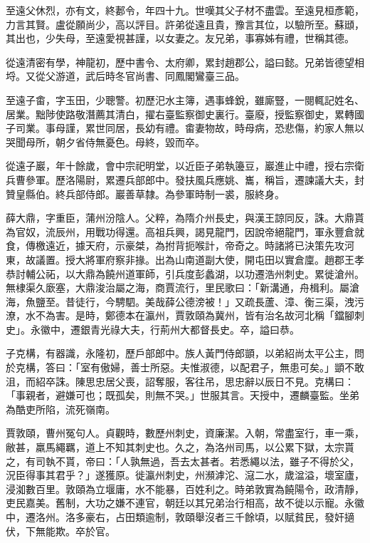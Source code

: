 \begin{pinyinscope}
 至遠父休烈，亦有文，終郪令，年四十九。世嘆其父子材不盡雲。至遠見桓彥範，力言其賢。盧從願尚少，高以評目。許弟從遠且貴，豫言其位，以驗所至。蘇頲，其出也，少失母，至遠愛視甚謹，以女妻之。友兄弟，事寡姊有禮，世稱其德。



 從遠清密有學，神龍初，歷中書令、太府卿，累封趙郡公，謚曰懿。兄弟皆德望相埒。又從父游道，武后時冬官尚書、同鳳閣鸞臺三品。



 至遠子畬，字玉田，少聰警。初歷汜水主簿，遇事蜂銳，雖廝豎，一閱輒記姓名、居業。黜陟使路敬潛薦其清白，擢右臺監察御史裏行。臺廢，授監察御史，累轉國子司業。事母謹，累世同居，長幼有禮。畬妻物故，時母病，恐悲傷，約家人無以哭聞母所，朝夕省侍無憂色。母終，毀而卒。



 從遠子巖，年十餘歲，會中宗祀明堂，以近臣子弟執籩豆，巖進止中禮，授右宗衛兵曹參軍。歷洛陽尉，累遷兵部郎中。發扶風兵應姚、巂，稱旨，遷諫議大夫，封贊皇縣伯。終兵部侍郎。巖善草隸。為參軍時制一裘，服終身。



 薛大鼎，字重臣，蒲州汾陰人。父粹，為隋介州長史，與漢王諒同反，誅。大鼎貰為官奴，流辰州，用戰功得還。高祖兵興，謁見龍門，因說帝絕龍門，軍永豐倉就食，傳檄遠近，據天府，示豪桀，為拊背扼喉計，帝奇之。時諸將已決策先攻河東，故議置。授大將軍府察非掾。出為山南道副大使，開屯田以實倉廩。趙郡王孝恭討輔公祏，以大鼎為饒州道軍師，引兵度彭蠡湖，以功遷浩州刺史。累徙滄州。無棣渠久廞塞，大鼎浚治屬之海，商賈流行，里民歌曰：「新溝通，舟楫利。屬滄海，魚鹽至。昔徒行，今騁駟。美哉薛公德滂被！」又疏長蘆、漳、衡三渠，洩污潦，水不為害。是時，鄭德本在瀛州，賈敦頤為冀州，皆有治名故河北稱「鐺腳刺史」。永徽中，遷銀青光祿大夫，行荊州大都督長史。卒，謚曰恭。



 子克構，有器識，永隆初，歷戶部郎中。族人黃門侍郎顗，以弟紹尚太平公主，問於克構，答曰：「室有傲婦，善士所惡。夫惟淑德，以配君子，無患可矣。」顗不敢沮，而紹卒誅。陳思忠居父喪，詔奪服，客往吊，思忠辭以辰日不見。克構曰：「事親者，避嫌可也；既孤矣，則無不哭。」世服其言。天授中，遷麟臺監。坐弟為酷吏所陷，流死嶺南。



 賈敦頤，曹州冤句人。貞觀時，數歷州刺史，資廉潔。入朝，常盡室行，車一乘，敝甚，羸馬繩羈，道上不知其刺史也。久之，為洛州司馬，以公累下獄，太宗貰之，有司執不貰，帝曰：「人孰無過，吾去太甚者。若悉繩以法，雖子不得於父，況臣得事其君乎？」遂獲原。徙瀛州刺史，州瀕滹沱、滱二水，歲湓溢，壞室廬，浸洳數百里。敦頤為立堰庸，水不能暴，百姓利之。時弟敦實為饒陽令，政清靜，吏民嘉美。舊制，大功之嫌不連官，朝廷以其兄弟治行相高，故不徙以示寵。永徽中，遷洛州。洛多豪右，占田類逾制，敦頤舉沒者三千餘頃，以賦貧民，發奸擿伏，下無能欺。卒於官。




\end{pinyinscope}
